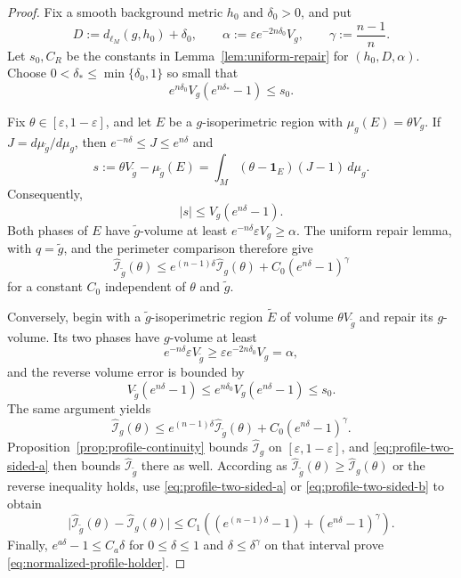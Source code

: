 \documentclass[11pt]{amsart}
\theoremstyle{definition}
\theoremstyle{remark}
\newcommand{\dMet}{d_{\ell_M}}
\newcommand{\dmu}[1]{\,d\mu_{#1}}
\newcommand{\one}{\mathbf 1}
\newcommand{\cI}{\mathcal I}
\begin{document}
\begin{proof}
Fix a smooth background metric $h_0$ and $\delta_0>0$, and put
\[
 D:=\dMet(g,h_0)+\delta_0,
 \qquad
 \alpha:=\varepsilon e^{-2n\delta_0}V_g,
 \qquad
 \gamma:=\frac{n-1}{n}.
\]
Let $s_0,C_R$ be the constants in Lemma~\ref{lem:uniform-repair} for
$(h_0,D,\alpha)$.  Choose
$0<\delta_*\leq\min\{\delta_0,1\}$ so small that
\begin{equation}\label{eq:delta-star-choice}
 e^{n\delta_0}V_g(e^{n\delta_*}-1)\leq s_0.
\end{equation}

Fix $\theta\in[\varepsilon,1-\varepsilon]$, and let $E$ be a
$g$-isoperimetric region with $\mu_g(E)=\theta V_g$.  If
$J=d\mu_{\widetilde g}/d\mu_g$, then
$e^{-n\delta}\leq J\leq e^{n\delta}$ and
\[
 s:=\theta V_{\widetilde g}-\mu_{\widetilde g}(E)
   =\int_M(\theta-\one_E)(J-1)\dmu g.
\]
Consequently,
\begin{equation}\label{eq:metric-volume-error}
 |s|\leq V_g(e^{n\delta}-1).
\end{equation}
Both phases of $E$ have $\widetilde g$-volume at least
$e^{-n\delta}\varepsilon V_g\geq\alpha$.  The uniform repair lemma, with
$q=\widetilde g$, and the perimeter comparison therefore give
\begin{equation}\label{eq:profile-two-sided-a}
 \widehat{\cI}_{\widetilde g}(\theta)
 \leq e^{(n-1)\delta}\widehat{\cI}_g(\theta)
   +C_0(e^{n\delta}-1)^\gamma
\end{equation}
for a constant $C_0$ independent of $\theta$ and $\widetilde g$.

Conversely, begin with a $\widetilde g$-isoperimetric region
$\widetilde E$ of volume $\theta V_{\widetilde g}$ and repair its $g$-volume.
Its two phases have $g$-volume at least
\[
 e^{-n\delta}\varepsilon V_{\widetilde g}
 \geq\varepsilon e^{-2n\delta_0}V_g=\alpha,
\]
and the reverse volume error is bounded by
\[
 V_{\widetilde g}(e^{n\delta}-1)
 \leq e^{n\delta_0}V_g(e^{n\delta}-1)\leq s_0.
\]
The same argument yields
\begin{equation}\label{eq:profile-two-sided-b}
 \widehat{\cI}_g(\theta)
 \leq e^{(n-1)\delta}\widehat{\cI}_{\widetilde g}(\theta)
   +C_0(e^{n\delta}-1)^\gamma.
\end{equation}
Proposition~\ref{prop:profile-continuity} bounds
$\widehat{\cI}_g$ on $[\varepsilon,1-\varepsilon]$, and
\eqref{eq:profile-two-sided-a} then bounds
$\widehat{\cI}_{\widetilde g}$ there as well.  According as
$\widehat{\cI}_{\widetilde g}(\theta)\geq\widehat{\cI}_g(\theta)$ or the
reverse inequality holds, use \eqref{eq:profile-two-sided-a} or
\eqref{eq:profile-two-sided-b} to obtain
\[
 \bigl|\widehat{\cI}_{\widetilde g}(\theta)
       -\widehat{\cI}_g(\theta)\bigr|
 \leq C_1\left((e^{(n-1)\delta}-1)
                +(e^{n\delta}-1)^\gamma\right).
\]
Finally, $e^{a\delta}-1\leq C_a\delta$ for $0\leq\delta\leq1$ and
$\delta\leq\delta^\gamma$ on that interval prove
\eqref{eq:normalized-profile-holder}.
\end{proof}
\end{document}
